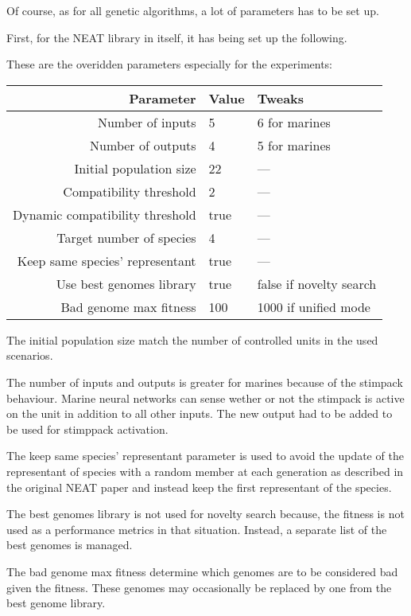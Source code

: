 Of course, as for all genetic algorithms, a lot of parameters has to be set up.

First, for the NEAT library in itself, it has being set up the following.

These are the overidden parameters especially for the experiments:

\begin{tabular}{rll}
    \toprule
    Parameter & Value & Tweaks \\
    \midrule
    Number of inputs & 5 & 6 for marines \\
    Number of outputs & 4 & 5 for marines \\
    Initial population size & 22  & — \\[1ex]

    Compatibility threshold & 2 & — \\
    Dynamic compatibility threshold & true & — \\
    Target number of species & 4 & — \\
    Keep same species' representant & true & — \\[1ex]

    Use best genomes library & true & false if novelty search \\
    Bad genome max fitness & 100 & 1000 if unified mode \\
    \bottomrule
\end{tabular}

The initial population size match the number of controlled units in the used scenarios.

The number of inputs and outputs is greater for marines because of the stimpack behaviour.
Marine neural networks can sense wether or not the stimpack is active on the unit in addition to all other inputs.
The new output had to be added to be used for stimppack activation.

The keep same species' representant parameter is used to avoid the update of the representant of species with a
random member at each generation as described in the original NEAT paper and instead keep the first representant of
the species.

The best genomes library is not used for novelty search because, the fitness is not used as a performance metrics in
that situation. Instead, a separate list of the best genomes is managed.

The bad genome max fitness determine which genomes are to be considered bad given the fitness. These genomes
may occasionally be replaced by one from the best genome library.

